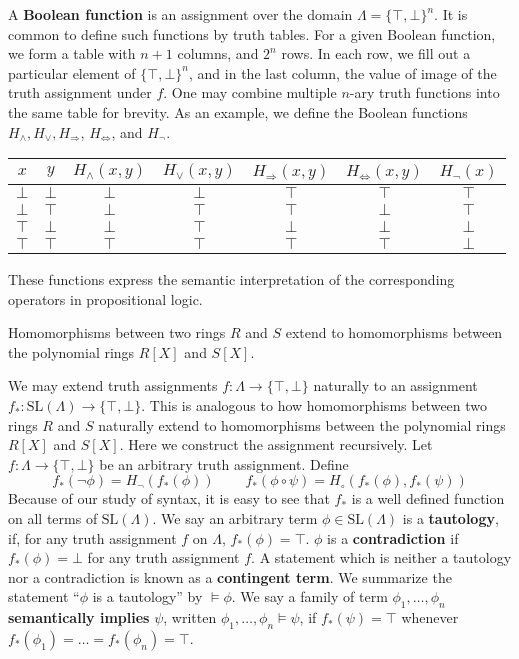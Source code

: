 \begin{example}
    A {\bf Boolean function} is an assignment over the domain $\Lambda = \{ \top, \bot \}^n$. It is common to define such functions by truth tables. For a given Boolean function, we form a table with $n + 1$ columns, and $2^{n}$ rows. In each row, we fill out a particular element of $\{ \top, \bot \}^n$, and in the last column, the value of image of the truth assignment under $f$. One may combine multiple $n$-ary truth functions into the same table for brevity. As an example, we define the Boolean functions $H_\wedge, H_\vee, H_\Rightarrow$, $H_{\Leftrightarrow}$, and $H_\neg$.
    \begin{center}
    \begin{tabular}{| c | c | c | c | c | c | c |}
        \hline $x$ & $y$ & $H_\wedge(x,y)$ & $H_\vee(x,y)$ & $H_\Rightarrow(x,y)$ & $H_\Leftrightarrow(x,y)$ & $H_\neg(x)$ \\
        \hline $\bot$ & $\bot$ & $\bot$ & $\bot$ & $\top$ & $\top$ & $\top$ \\
        $\bot$ & $\top$ & $\bot$ & $\top$ & $\top$ & $\bot$ & $\top$ \\
        $\top$ & $\bot$ & $\bot$ & $\top$ & $\bot$ & $\bot$ & $\bot$ \\
        $\top$ & $\top$ & $\top$ & $\top$ & $\top$ & $\top$ & $\bot$ \\
        \hline
    \end{tabular}
    \end{center}
    These functions express the semantic interpretation of the corresponding operators in propositional logic.
\end{example}

Homomorphisms between two rings $R$ and $S$ extend to homomorphisms between the polynomial rings $R[X]$ and $S[X]$.

We may extend truth assignments $f: \Lambda \to \{ \top, \bot \}$ naturally to an assignment $f_*: \text{SL}(\Lambda) \to \{ \top, \bot \}$. This is analogous to how homomorphisms between two rings $R$ and $S$ naturally extend to homomorphisms between the polynomial rings $R[X]$ and $S[X]$. Here we construct the assignment recursively. Let $f: \Lambda \to \{ \top, \bot \}$ be an arbitrary truth assignment. Define
%
\[ f_*(\neg \phi) = H_\neg(f_*(\phi))\ \ \ \ \ \ \ \ \ \ f_*(\phi \circ \psi) = H_\circ(f_*(\phi), f_*(\psi)) \]
%
Because of our study of syntax, it is easy to see that $f_*$ is a well defined function on all terms of $\text{SL}(\Lambda)$. We say an arbitrary term $\phi \in \text{SL}(\Lambda)$ is a {\bf tautology}, if, for any truth assignment $f$ on $\Lambda$, $f_*(\phi) = \top$. $\phi$ is a {\bf contradiction} if $f_*(\phi) = \bot$ for any truth assignment $f$. A statement which is neither a tautology nor a contradiction is known as a {\bf contingent term}. We summarize the statement ``$\phi$ is a tautology'' by $\vDash \phi$. We say a family of term $\phi_1, \dots, \phi_n$ {\bf semantically implies} $\psi$, written $\phi_1, \dots, \phi_n \vDash \psi$, if $f_*(\psi) = \top$ whenever $f_*(\phi_1) = \dots = f_*(\phi_n) = \top$.

